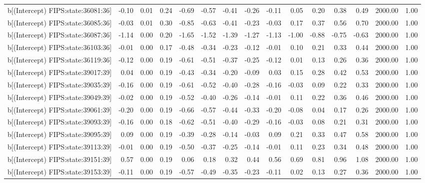 \begin{table}[ht]
\begin{tabular}{rrrrrrrrrrrrrrr}
  b[(Intercept) FIPS:state:36081:36] & -0.10 & 0.01 & 0.24 & -0.69 & -0.57 & -0.41 & -0.26 & -0.11 & 0.05 & 0.20 & 0.38 & 0.49 & 2000.00 & 1.00 \\ 
  b[(Intercept) FIPS:state:36085:36] & -0.03 & 0.01 & 0.30 & -0.85 & -0.63 & -0.41 & -0.23 & -0.03 & 0.17 & 0.37 & 0.56 & 0.70 & 2000.00 & 1.00 \\ 
  b[(Intercept) FIPS:state:36087:36] & -1.14 & 0.00 & 0.20 & -1.65 & -1.52 & -1.39 & -1.27 & -1.13 & -1.00 & -0.88 & -0.75 & -0.63 & 2000.00 & 1.00 \\ 
  b[(Intercept) FIPS:state:36103:36] & -0.01 & 0.00 & 0.17 & -0.48 & -0.34 & -0.23 & -0.12 & -0.01 & 0.10 & 0.21 & 0.33 & 0.44 & 2000.00 & 1.00 \\ 
  b[(Intercept) FIPS:state:36119:36] & -0.12 & 0.00 & 0.19 & -0.61 & -0.51 & -0.37 & -0.25 & -0.12 & 0.01 & 0.13 & 0.26 & 0.36 & 2000.00 & 1.00 \\ 
  b[(Intercept) FIPS:state:39017:39] & 0.04 & 0.00 & 0.19 & -0.43 & -0.34 & -0.20 & -0.09 & 0.03 & 0.15 & 0.28 & 0.42 & 0.53 & 2000.00 & 1.00 \\ 
  b[(Intercept) FIPS:state:39035:39] & -0.16 & 0.00 & 0.19 & -0.61 & -0.52 & -0.40 & -0.28 & -0.16 & -0.03 & 0.09 & 0.22 & 0.33 & 2000.00 & 1.00 \\ 
  b[(Intercept) FIPS:state:39049:39] & -0.02 & 0.00 & 0.19 & -0.52 & -0.40 & -0.26 & -0.14 & -0.01 & 0.11 & 0.22 & 0.36 & 0.46 & 2000.00 & 1.00 \\ 
  b[(Intercept) FIPS:state:39061:39] & -0.20 & 0.00 & 0.19 & -0.66 & -0.57 & -0.44 & -0.33 & -0.20 & -0.08 & 0.04 & 0.17 & 0.26 & 2000.00 & 1.00 \\ 
  b[(Intercept) FIPS:state:39093:39] & -0.16 & 0.00 & 0.18 & -0.62 & -0.51 & -0.40 & -0.29 & -0.16 & -0.03 & 0.08 & 0.21 & 0.31 & 2000.00 & 1.00 \\ 
  b[(Intercept) FIPS:state:39095:39] & 0.09 & 0.00 & 0.19 & -0.39 & -0.28 & -0.14 & -0.03 & 0.09 & 0.21 & 0.33 & 0.47 & 0.58 & 2000.00 & 1.00 \\ 
  b[(Intercept) FIPS:state:39113:39] & -0.01 & 0.00 & 0.19 & -0.50 & -0.37 & -0.25 & -0.14 & -0.01 & 0.11 & 0.23 & 0.34 & 0.48 & 2000.00 & 1.00 \\ 
  b[(Intercept) FIPS:state:39151:39] & 0.57 & 0.00 & 0.19 & 0.06 & 0.18 & 0.32 & 0.44 & 0.56 & 0.69 & 0.81 & 0.96 & 1.08 & 2000.00 & 1.00 \\ 
  b[(Intercept) FIPS:state:39153:39] & -0.11 & 0.00 & 0.19 & -0.57 & -0.49 & -0.35 & -0.23 & -0.11 & 0.02 & 0.13 & 0.27 & 0.36 & 2000.00 & 1.00 \\ 

\end{tabular}
\end{table}
